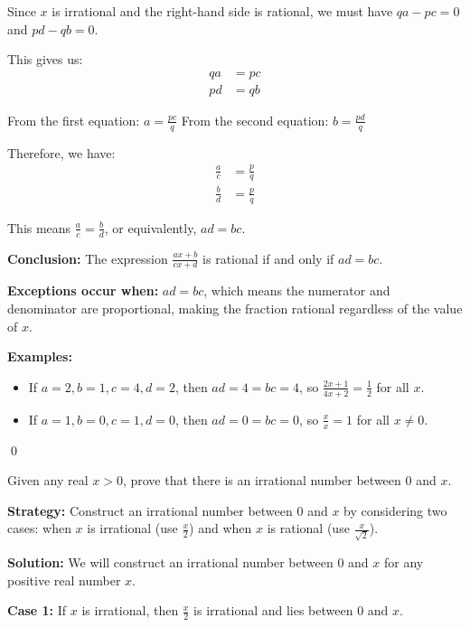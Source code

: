 Since $x$ is irrational and the right-hand side is rational, we must have $qa - pc = 0$ and $pd - qb = 0$.

This gives us:
\begin{align*}
qa &= pc \\
pd &= qb
\end{align*}

From the first equation: $a = \frac{pc}{q}$
From the second equation: $b = \frac{pd}{q}$

Therefore, we have:
\begin{align*}
\frac{a}{c} &= \frac{p}{q} \\
\frac{b}{d} &= \frac{p}{q}
\end{align*}

This means $\frac{a}{c} = \frac{b}{d}$, or equivalently, $ad = bc$.

\textbf{Conclusion:}
The expression $\frac{ax + b}{cx + d}$ is rational if and only if $ad = bc$.

\textbf{Exceptions occur when:}
$ad = bc$, which means the numerator and denominator are proportional, making the fraction rational regardless of the value of $x$.

\textbf{Examples:}
\begin{itemize}
\item If $a = 2, b = 1, c = 4, d = 2$, then $ad = 4 = bc = 4$, so $\frac{2x + 1}{4x + 2} = \frac{1}{2}$ for all $x$.
\item If $a = 1, b = 0, c = 1, d = 0$, then $ad = 0 = bc = 0$, so $\frac{x}{x} = 1$ for all $x \neq 0$.
\end{itemize}\qed


\begin{problembox}
\begin{problemstatement}
Given any real $x > 0$, prove that there is an irrational number between $0$ and $x$.
\end{problemstatement}
\end{problembox}

\noindent\textbf{Strategy:} Construct an irrational number between $0$ and $x$ by considering two cases: when $x$ is irrational (use $\frac{x}{2}$) and when $x$ is rational (use $\frac{x}{\sqrt{2}}$).

\bigskip\noindent\textbf{Solution:}
We will construct an irrational number between $0$ and $x$ for any positive real number $x$.

\textbf{Case 1:} If $x$ is irrational, then $\frac{x}{2}$ is irrational and lies between $0$ and $x$.

